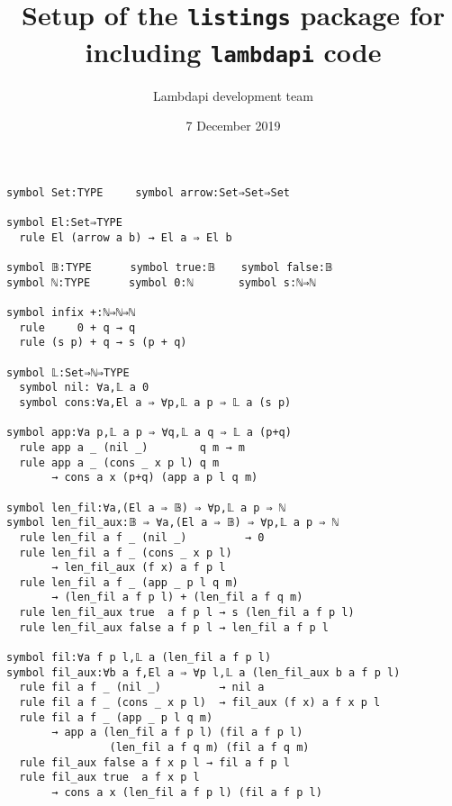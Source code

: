 \documentclass{article}
\title{Setup of the {\tt listings} package for including {\tt lambdapi} code}
\author{Lambdapi development team}
\date{7 December 2019}
\begin{document}
\maketitle

\small
\begin{lstlisting}
symbol Set:TYPE     symbol arrow:Set⇒Set⇒Set

symbol El:Set⇒TYPE
  rule El (arrow a b) → El a ⇒ El b

symbol 𝔹:TYPE      symbol true:𝔹    symbol false:𝔹
symbol ℕ:TYPE      symbol 0:ℕ       symbol s:ℕ⇒ℕ

symbol infix +:ℕ⇒ℕ⇒ℕ
  rule     0 + q → q
  rule (s p) + q → s (p + q)

symbol 𝕃:Set⇒ℕ⇒TYPE
  symbol nil: ∀a,𝕃 a 0
  symbol cons:∀a,El a ⇒ ∀p,𝕃 a p ⇒ 𝕃 a (s p)

symbol app:∀a p,𝕃 a p ⇒ ∀q,𝕃 a q ⇒ 𝕃 a (p+q)
  rule app a _ (nil _)        q m → m
  rule app a _ (cons _ x p l) q m
       → cons a x (p+q) (app a p l q m)

symbol len_fil:∀a,(El a ⇒ 𝔹) ⇒ ∀p,𝕃 a p ⇒ ℕ
symbol len_fil_aux:𝔹 ⇒ ∀a,(El a ⇒ 𝔹) ⇒ ∀p,𝕃 a p ⇒ ℕ
  rule len_fil a f _ (nil _)         → 0
  rule len_fil a f _ (cons _ x p l)
       → len_fil_aux (f x) a f p l
  rule len_fil a f _ (app _ p l q m)
       → (len_fil a f p l) + (len_fil a f q m)
  rule len_fil_aux true  a f p l → s (len_fil a f p l)
  rule len_fil_aux false a f p l → len_fil a f p l

symbol fil:∀a f p l,𝕃 a (len_fil a f p l)
symbol fil_aux:∀b a f,El a ⇒ ∀p l,𝕃 a (len_fil_aux b a f p l)
  rule fil a f _ (nil _)         → nil a
  rule fil a f _ (cons _ x p l)  → fil_aux (f x) a f x p l
  rule fil a f _ (app _ p l q m)
       → app a (len_fil a f p l) (fil a f p l)
                (len_fil a f q m) (fil a f q m)
  rule fil_aux false a f x p l → fil a f p l
  rule fil_aux true  a f x p l
       → cons a x (len_fil a f p l) (fil a f p l)
\end{lstlisting}
\end{document}
